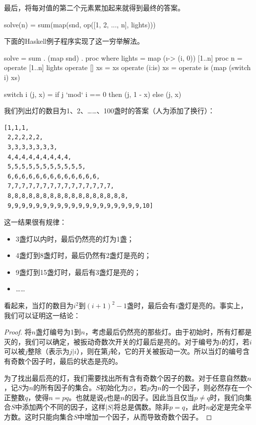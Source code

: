 \documentclass[b5paper]{ctexart}
\begin{document}
最后，将每对值的第二个元素累加起来就得到最终的答案。

\be
solve(n) = sum(map(snd, op([1, 2, ..., n], lights)))
\ee

下面的Haskell例子程序实现了这一穷举解法。

\begin{Haskell}
solve = sum . (map snd) . proc  where
    lights = map (\i -> (i, 0)) [1..n]
    proc n = operate [1..n] lights
    operate [] xs = xs
    operate (i:is) xs = operate is (map (switch i) xs)

switch i (j, x) = if j `mod` i == 0 then (j, 1 - x) else (j, x)
\end{Haskell} %

我们列出灯的数目为1、2、……、100盏时的答案（人为添加了换行）：

\begin{verbatim}
[1,1,1,
 2,2,2,2,2,
 3,3,3,3,3,3,3,
 4,4,4,4,4,4,4,4,4,
 5,5,5,5,5,5,5,5,5,5,5,
 6,6,6,6,6,6,6,6,6,6,6,6,6,
 7,7,7,7,7,7,7,7,7,7,7,7,7,7,7,
 8,8,8,8,8,8,8,8,8,8,8,8,8,8,8,8,8,
 9,9,9,9,9,9,9,9,9,9,9,9,9,9,9,9,9,9,9,10]
\end{verbatim}

这一结果很有规律：

\begin{itemize}
\item 3盏灯以内时，最后仍然亮的灯为1盏；
\item 4盏灯到8盏灯时，最后仍然有2盏灯是亮的；
\item 9盏灯到15盏灯时，最后有3盏灯是亮的；
\item ……
\end{itemize}

看起来，当灯的数目为$i^2$到$(i+1)^2-1$盏时，最后会有$i$盏灯是亮的。事实上，我们可以证明这一结论：

\begin{proof}
将$n$盏灯编号为1到$n$，考虑最后仍然亮的那些灯。由于初始时，所有灯都是灭的，我们可以确定，被扳动奇数次开关的灯最后是亮的。对于编号为$i$的灯，若$i$可以被$j$整除（表示为$j | i$），则在第$j$轮，它的开关被扳动一次。所以当灯的编号含有奇数个因子时，最后的状态是亮的。

为了找出最后亮的灯，我们需要找出所有含有奇数个因子的数。对于任意自然数$n$，记$S$为$n$的所有因子的集合。$S$初始化为$\varnothing$，若$p$为$n$的一个因子，则必然存在一个正整数$q$，使得$n = p q$。也就是说$q$也是$n$的因子。因此当且仅当$p \neq q$时，我们向集合$S$中添加两个不同的因子，这样$|S|$将总是偶数。除非$p = q$，此时$n$必定是完全平方数。这时只能向集合$S$中增加一个因子，从而导致奇数个因子。
\end{proof}
\end{document}
